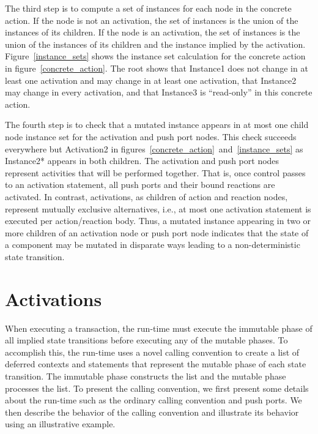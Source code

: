 The third step is to compute a set of instances for each node in the concrete action.
If the node is not an activation, the set of instances is the union of the instances of its children.
If the node is an activation, the set of instances is the union of the instances of its children and the instance implied by the activation.
Figure~\ref{instance_sets} shows the instance set calculation for the concrete action in figure~\ref{concrete_action}.
The root shows that Instance1 does not change in at least one activation and may change in at least one activation, that Instance2 may change in every activation, and that Instance3 is ``read-only'' in this concrete action.

The fourth step is to check that a mutated instance appears in at most one child node instance set for the activation and push port nodes.
This check succeeds everywhere but Activation2 in figures~\ref{concrete_action}~and~\ref{instance_sets} as Instance2* appears in both children.
The activation and push port nodes represent activities that will be performed together.
That is, once control passes to an activation statement, all push ports and their bound reactions are activated.
In contrast, activations, as children of action and reaction nodes, represent mutually exclusive alternatives, i.e., at most one activation statement is executed per action/reaction body.
Thus, a mutated instance appearing in two or more children of an activation node or push port node indicates that the state of a component may be mutated in disparate ways leading to a non-deterministic state transition.

\section{Activations}

When executing a transaction, the run-time must execute the immutable phase of all implied state transitions before executing any of the mutable phases.
To accomplish this, the run-time uses a novel calling convention to create a list of deferred contexts and statements that represent the mutable phase of each state transition.
The immutable phase constructs the list and the mutable phase processes the list.
To present the calling convention, we first present some details about the run-time such as the ordinary calling convention and push ports.
We then describe the behavior of the calling convention and illustrate its behavior using an illustrative example.

